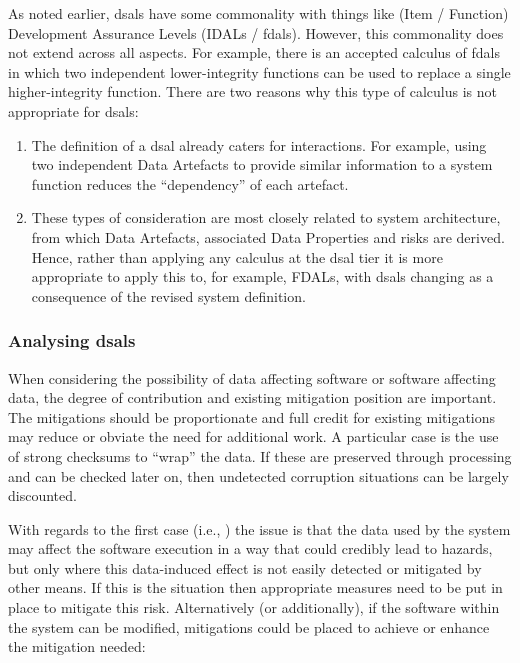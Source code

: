 As noted earlier, \glspl{dsal} have some commonality with things like (Item / Function) Development Assurance Levels (IDALs / \glspl{fdal}). However, this commonality does not extend across all aspects. For example, there is an accepted calculus of \glspl{fdal} in which two independent lower-integrity functions can be used to replace a single higher-integrity function. There are two reasons why this type of calculus is not appropriate for \glspl{dsal}:

\begin{enumerate}
  \item The definition of a \gls{dsal} already caters for interactions. For example, using two independent Data Artefacts to provide similar information to a system function reduces the ``dependency'' of each artefact.
  \item These types of consideration are most closely related to system architecture, from which Data Artefacts, associated Data Properties and risks are derived. Hence, rather than applying any calculus at the \gls{dsal} tier it is more appropriate to apply this to, for example, FDALs, with \glspl{dsal} changing as a consequence of the revised system definition.
\end{enumerate}

\subsubsection{Analysing \glspl{dsal}}
When considering the possibility of data affecting software or software affecting data, the degree of contribution and existing mitigation position are important. The mitigations should be proportionate and full credit for existing mitigations may reduce or obviate the need for additional work. A particular case is the use of strong checksums to ``wrap'' the data. If these are preserved through processing and can be checked later on, then undetected  corruption situations can be largely discounted.

With regards to the first case (i.e., ) the issue is that the data used by the system may affect the software execution in a way that could credibly lead to hazards, but only where this data-induced effect is not easily detected or mitigated by other means. If this is the situation then appropriate measures need to be put in place  to mitigate this risk. Alternatively (or additionally), if the software within the system can be modified, mitigations could be placed  to achieve or enhance the mitigation needed:


